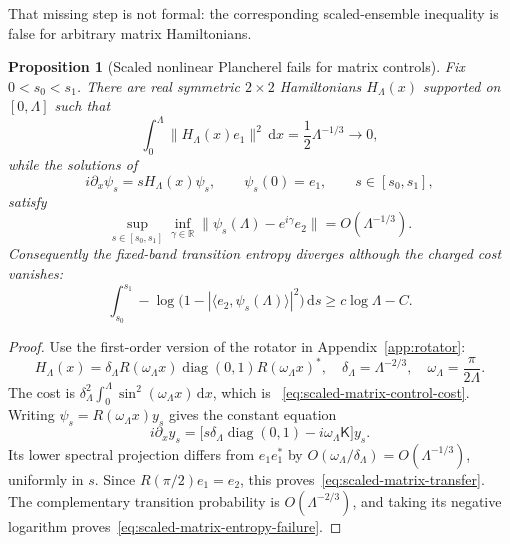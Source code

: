 \documentclass[11pt]{article}
\newcommand{\dd}{\,\mathrm d}
\DeclareMathOperator{\diag}{diag}
\newtheorem{proposition}[theorem]{Proposition}
\theoremstyle{definition}
\theoremstyle{remark}
\begin{document}
That missing step is not formal: the corresponding scaled-ensemble inequality
is false for arbitrary matrix Hamiltonians.

\begin{proposition}[Scaled nonlinear Plancherel fails for matrix controls]
\label{prop:scaled-matrix-ensemble-no-go}
Fix $0<s_0<s_1$.  There are real symmetric $2\times2$ Hamiltonians
$H_\Lambda(x)$ supported on $[0,\Lambda]$ such that
\begin{equation}
 \int_0^\Lambda\|H_\Lambda(x)e_1\|^2\dd x
 =\frac12\Lambda^{-1/3}\longrightarrow0,
 \label{eq:scaled-matrix-control-cost}
\end{equation}
while the solutions of
\begin{equation}
 i\partial_x\psi_s=sH_\Lambda(x)\psi_s,
 \qquad \psi_s(0)=e_1,\qquad s\in[s_0,s_1],
 \label{eq:scaled-matrix-ensemble}
\end{equation}
satisfy
\begin{equation}
 \sup_{s\in[s_0,s_1]}
 \inf_{\gamma\in\mathbb R}
 \|\psi_s(\Lambda)-e^{i\gamma}e_2\|
 =O(\Lambda^{-1/3}).
 \label{eq:scaled-matrix-transfer}
\end{equation}
Consequently the fixed-band transition entropy diverges although the charged
cost vanishes:
\begin{equation}
 \int_{s_0}^{s_1}
 -\log\bigl(1-|\langle e_2,\psi_s(\Lambda)\rangle|^2\bigr)\dd s
 \geq c\log\Lambda-C.
 \label{eq:scaled-matrix-entropy-failure}
\end{equation}
\end{proposition}

\begin{proof}
Use the first-order version of the rotator in Appendix~\ref{app:rotator}:
\begin{equation}
 H_\Lambda(x)=\delta_\Lambda
 R(\omega_\Lambda x)\diag(0,1)R(\omega_\Lambda x)^*,
 \quad
 \delta_\Lambda=\Lambda^{-2/3},
 \quad
 \omega_\Lambda=\frac\pi{2\Lambda}.
\end{equation}
The cost is
$\delta_\Lambda^2\int_0^\Lambda\sin^2(\omega_\Lambda x)\dd x$, which is
~\eqref{eq:scaled-matrix-control-cost}.  Writing
$\psi_s=R(\omega_\Lambda x)y_s$ gives the constant equation
\begin{equation}
 i\partial_xy_s=
 \bigl[s\delta_\Lambda\diag(0,1)-i\omega_\Lambda\mathsf K\bigr]y_s.
\end{equation}
Its lower spectral projection differs from $e_1e_1^*$ by
$O(\omega_\Lambda/\delta_\Lambda)=O(\Lambda^{-1/3})$, uniformly in $s$.
Since $R(\pi/2)e_1=e_2$, this proves~\eqref{eq:scaled-matrix-transfer}.
The complementary transition probability is $O(\Lambda^{-2/3})$, and taking
its negative logarithm proves~\eqref{eq:scaled-matrix-entropy-failure}.
\end{proof}
\end{document}
